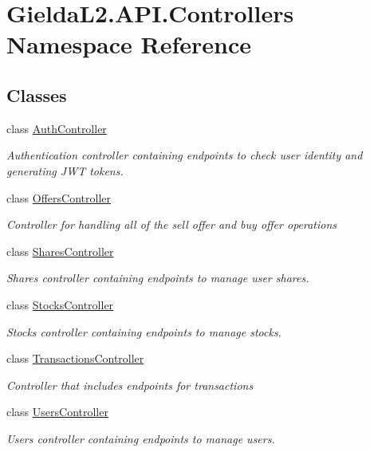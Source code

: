 \hypertarget{namespace_gielda_l2_1_1_a_p_i_1_1_controllers}{}\section{Gielda\+L2.\+A\+P\+I.\+Controllers Namespace Reference}
\label{namespace_gielda_l2_1_1_a_p_i_1_1_controllers}
\subsection*{Classes}
\begin{DoxyCompactItemize}
\item 
class \mbox{\hyperlink{class_gielda_l2_1_1_a_p_i_1_1_controllers_1_1_auth_controller}{Auth\+Controller}}
\begin{DoxyCompactList}\small\item\em Authentication controller containing endpoints to check user identity and generating J\+WT tokens. \end{DoxyCompactList}\item 
class \mbox{\hyperlink{class_gielda_l2_1_1_a_p_i_1_1_controllers_1_1_offers_controller}{Offers\+Controller}}
\begin{DoxyCompactList}\small\item\em Controller for handling all of the sell offer and buy offer operations \end{DoxyCompactList}\item 
class \mbox{\hyperlink{class_gielda_l2_1_1_a_p_i_1_1_controllers_1_1_shares_controller}{Shares\+Controller}}
\begin{DoxyCompactList}\small\item\em Shares controller containing endpoints to manage user shares. \end{DoxyCompactList}\item 
class \mbox{\hyperlink{class_gielda_l2_1_1_a_p_i_1_1_controllers_1_1_stocks_controller}{Stocks\+Controller}}
\begin{DoxyCompactList}\small\item\em Stocks controller containing endpoints to manage stocks. \end{DoxyCompactList}\item 
class \mbox{\hyperlink{class_gielda_l2_1_1_a_p_i_1_1_controllers_1_1_transactions_controller}{Transactions\+Controller}}
\begin{DoxyCompactList}\small\item\em Controller that includes endpoints for transactions \end{DoxyCompactList}\item 
class \mbox{\hyperlink{class_gielda_l2_1_1_a_p_i_1_1_controllers_1_1_users_controller}{Users\+Controller}}
\begin{DoxyCompactList}\small\item\em Users controller containing endpoints to manage users. \end{DoxyCompactList}\end{DoxyCompactItemize}
